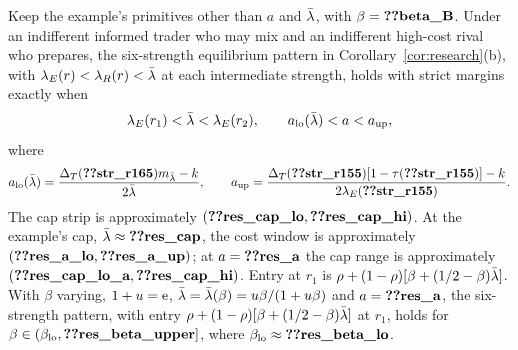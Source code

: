 \begin{proposition}\label{prop:researchregion}
Keep the example's primitives other than \(a\) and \(\bar\lambda\), with \(\beta=\reg{beta_B}\).
Under an indifferent informed trader who may mix and an indifferent high-cost rival who prepares, the six-strength
equilibrium pattern in Corollary~\ref{cor:research}(b), with
\(\lambda_E(r)<\lambda_R(r)<\bar\lambda\) at each intermediate strength, holds with strict margins exactly when
\[
 \lambda_E(r_1)<\bar\lambda<\lambda_E(r_2),\qquad a_{\rm lo}(\bar\lambda)<a<a_{\rm up},
\]
where
\[
 a_{\rm lo}(\lb)=\frac{\DT(\reg{str_r165})m_{\lb}-k}{2\lb},\qquad
 a_{\rm up}=\frac{\DT(\reg{str_r155})[1-\tau(\reg{str_r155})]-k}{2\lambda_E(\reg{str_r155})}.
\]
The cap strip is approximately \((\reg{res_cap_lo},\reg{res_cap_hi})\). At the example's cap,
\(\lb\approx\reg{res_cap}\), the cost window
is approximately \((\reg{res_a_lo},\reg{res_a_up})\); at \(a=\reg{res_a}\) the cap range is approximately
\((\reg{res_cap_lo_a},\reg{res_cap_hi})\). Entry at \(r_1\) is
\(\rho+(1-\rho)[\beta+(1/2-\beta)\bar\lambda]\).
With \(\beta\) varying, \(1+u=\mathrm{e}\), \(\bar\lambda=\bar\lambda(\beta)=u\beta/(1+u\beta)\) and \(a=\reg{res_a}\), the
six-strength pattern, with entry \(\rho+(1-\rho)[\beta+(1/2-\beta)\bar\lambda]\) at \(r_1\), holds for
\(\beta\in(\beta_{\rm lo},\reg{res_beta_upper}]\), where \(\beta_{\rm lo}\approx\reg{res_beta_lo}\).
\end{proposition}

